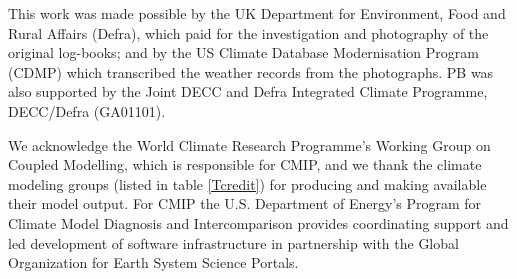 \documentclass[CP]{copernicus}
\begin{document}
\begin{acknowledgement}
This work was made possible by the UK Department for Environment, Food and Rural Affairs (Defra), which paid for the investigation and photography of the original log-books; and by the US Climate Database Modernisation Program (CDMP) which transcribed the weather records from the photographs. PB was also supported by the Joint DECC and Defra Integrated Climate Programme, DECC/Defra (GA01101).
 
We acknowledge the World Climate Research Programme's Working Group on Coupled Modelling, which is responsible for CMIP, and we thank the climate modeling groups (listed in table \ref{Tcredit}) for producing and making available their model output. For CMIP the U.S. Department of Energy's Program for Climate Model Diagnosis and Intercomparison provides coordinating support and led development of software infrastructure in partnership with the Global Organization for Earth System Science Portals.
\end{acknowledgement}



\end{document}
